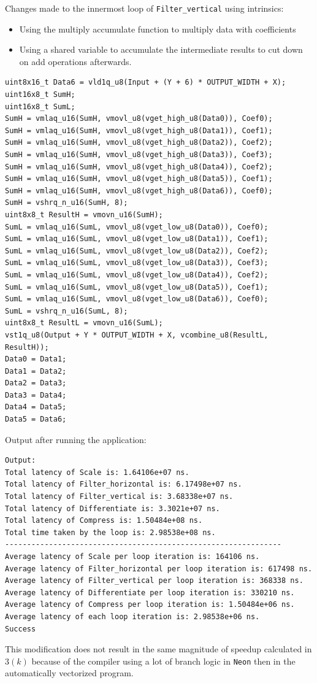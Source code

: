 \documentclass[
  course = {{ESE532 System-on-a-Chip}},
  quartile = {{}},
  assignment = 4,
  name = {{Sheil Sarda, Kate Ballard}},
  studentnumber = {{}},
  email = {{sheils@seas.upenn.edu, kballard@seas.upenn.edu}},
  firstexercise = 1
]{aga-homework}
\begin{document}
\subexercise
Changes made to the innermost loop of \verb|Filter_vertical| using intrinsics:
\begin{itemize}
	\item Using the multiply accumulate function to multiply data with coefficients 
	\item Using a shared variable to accumulate the intermediate results to cut down on add operations afterwards.
\end{itemize}
\begin{verbatim}
uint8x16_t Data6 = vld1q_u8(Input + (Y + 6) * OUTPUT_WIDTH + X);
uint16x8_t SumH;
uint16x8_t SumL;
SumH = vmlaq_u16(SumH, vmovl_u8(vget_high_u8(Data0)), Coef0);
SumH = vmlaq_u16(SumH, vmovl_u8(vget_high_u8(Data1)), Coef1);
SumH = vmlaq_u16(SumH, vmovl_u8(vget_high_u8(Data2)), Coef2);
SumH = vmlaq_u16(SumH, vmovl_u8(vget_high_u8(Data3)), Coef3);
SumH = vmlaq_u16(SumH, vmovl_u8(vget_high_u8(Data4)), Coef2);
SumH = vmlaq_u16(SumH, vmovl_u8(vget_high_u8(Data5)), Coef1);
SumH = vmlaq_u16(SumH, vmovl_u8(vget_high_u8(Data6)), Coef0);
SumH = vshrq_n_u16(SumH, 8);
uint8x8_t ResultH = vmovn_u16(SumH);
SumL = vmlaq_u16(SumL, vmovl_u8(vget_low_u8(Data0)), Coef0);
SumL = vmlaq_u16(SumL, vmovl_u8(vget_low_u8(Data1)), Coef1);
SumL = vmlaq_u16(SumL, vmovl_u8(vget_low_u8(Data2)), Coef2);
SumL = vmlaq_u16(SumL, vmovl_u8(vget_low_u8(Data3)), Coef3);
SumL = vmlaq_u16(SumL, vmovl_u8(vget_low_u8(Data4)), Coef2);
SumL = vmlaq_u16(SumL, vmovl_u8(vget_low_u8(Data5)), Coef1);
SumL = vmlaq_u16(SumL, vmovl_u8(vget_low_u8(Data6)), Coef0);
SumL = vshrq_n_u16(SumL, 8);
uint8x8_t ResultL = vmovn_u16(SumL);
vst1q_u8(Output + Y * OUTPUT_WIDTH + X, vcombine_u8(ResultL, ResultH));
Data0 = Data1;
Data1 = Data2;
Data2 = Data3;
Data3 = Data4;
Data4 = Data5;
Data5 = Data6;
\end{verbatim}
Output after running the application:
\begin{verbatim}
Output:
Total latency of Scale is: 1.64106e+07 ns.
Total latency of Filter_horizontal is: 6.17498e+07 ns.
Total latency of Filter_vertical is: 3.68338e+07 ns.
Total latency of Differentiate is: 3.3021e+07 ns.
Total latency of Compress is: 1.50484e+08 ns.
Total time taken by the loop is: 2.98538e+08 ns.
---------------------------------------------------------------
Average latency of Scale per loop iteration is: 164106 ns.
Average latency of Filter_horizontal per loop iteration is: 617498 ns.
Average latency of Filter_vertical per loop iteration is: 368338 ns.
Average latency of Differentiate per loop iteration is: 330210 ns.
Average latency of Compress per loop iteration is: 1.50484e+06 ns.
Average latency of each loop iteration is: 2.98538e+06 ns.
Success
\end{verbatim}
\subexercise
This modification does not result in the same magnitude of speedup calculated in $3 (k)$ because of the compiler using a lot of branch logic in \verb|Neon| then in the automatically vectorized program.
\end{document}
